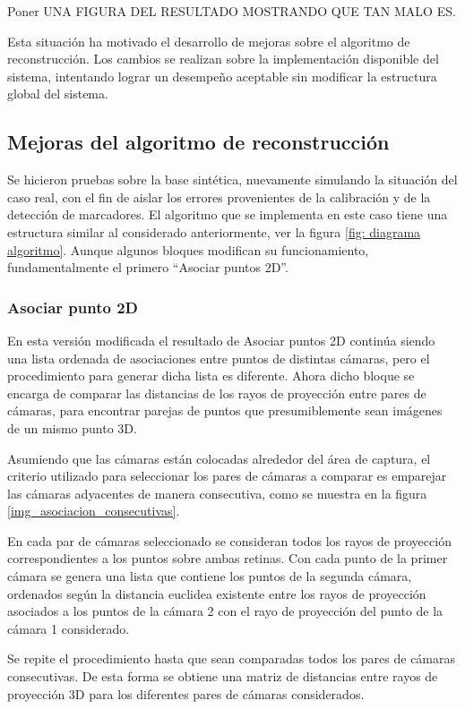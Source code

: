 Poner UNA FIGURA DEL RESULTADO MOSTRANDO QUE TAN MALO ES.

Esta situación ha motivado el desarrollo de mejoras sobre el algoritmo de reconstrucción. Los cambios se realizan sobre la implementación disponible del sistema, intentando lograr un desempeño aceptable sin modificar la estructura global del sistema.

\subsection{Mejoras del algoritmo de reconstrucción}


Se hicieron pruebas sobre la base sintética, nuevamente simulando la situación del caso real, con el fin de aislar los errores provenientes de la calibración y de la detección de marcadores.
El algoritmo que se implementa en este caso tiene una estructura similar al considerado anteriormente, ver la figura \ref{fig: diagrama algoritmo}. Aunque algunos bloques modifican su funcionamiento, fundamentalmente el primero  “Asociar puntos 2D”.

\subsubsection{Asociar punto 2D}

En esta versión modificada el resultado de Asociar puntos 2D continúa siendo una lista ordenada de asociaciones entre puntos de distintas cámaras, pero el procedimiento para generar dicha lista es diferente.  Ahora dicho bloque se encarga  de comparar  las distancias de los rayos de proyección entre pares de cámaras, para encontrar parejas de puntos que presumiblemente sean imágenes de un mismo punto 3D.  

Asumiendo que las cámaras están colocadas alrededor del área de captura, el criterio utilizado para seleccionar los pares de cámaras a comparar es emparejar las cámaras adyacentes de manera consecutiva, como se muestra en la figura  \ref{img_asociacion_consecutivas}.

En cada par de cámaras seleccionado se consideran todos los rayos de proyección correspondientes a los puntos sobre ambas retinas. Con  cada punto de la primer cámara se genera una lista que contiene los puntos de la segunda cámara, ordenados según  la distancia euclidea existente entre los rayos de proyección asociados a los puntos de la cámara 2  con el rayo de proyección del punto de la cámara 1 considerado. 


Se repite el procedimiento hasta que sean comparadas todos los pares de cámaras consecutivas. De esta forma se obtiene una matriz de distancias entre rayos de proyección 3D para los diferentes pares de cámaras considerados.


